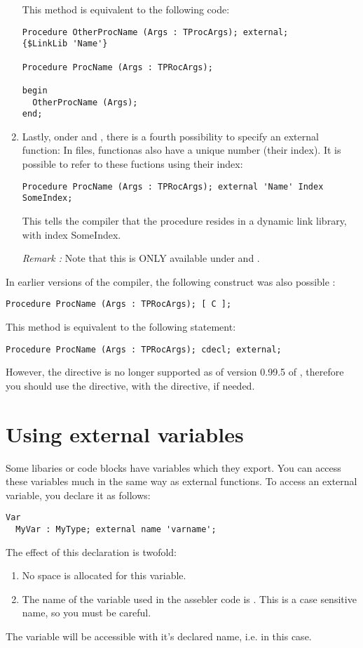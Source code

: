 \documentclass{report}
\begin{document}
\begin{enumerate}
This method is equivalent to the following code:
\begin{verbatim}
Procedure OtherProcName (Args : TProcArgs); external;
{$LinkLib 'Name'}

Procedure ProcName (Args : TPRocArgs);

begin
  OtherProcName (Args);
end;
\end{verbatim}
\item Lastly, onder \windows and \ostwo, there is a fourth possibility
to specify an external function: In  files, functionas also have
a unique number (their index). It is possible to refer to these fuctions
using their index:
\begin{verbatim}
Procedure ProcName (Args : TPRocArgs); external 'Name' Index SomeIndex;
\end{verbatim}
This tells the compiler that the procedure  resides in a
dynamic link library, with index {SomeIndex}.

{\em Remark :} Note that this is ONLY available under \windows and \ostwo.
\end{enumerate}

In earlier versions of the \fpc compiler, the following construct was
also possible :
\begin{verbatim}
Procedure ProcName (Args : TPRocArgs); [ C ];
\end{verbatim}
This method is equivalent to the following statement:
\begin{verbatim}
Procedure ProcName (Args : TPRocArgs); cdecl; external;
\end{verbatim}
However, the \var{[ C ]} directive is no longer supported as of version
0.99.5  of \fpc, therefore you should use the  directive,
with the  directive, if needed.

\section{Using external variables}
\label{se:ExternalVars}

Some libaries or code blocks have variables which they export. You can access
these variables much in the same way as external functions. To access an
external variable, you declare it as follows:

\begin{verbatim}
Var
  MyVar : MyType; external name 'varname';
\end{verbatim}
The effect of this declaration is twofold:
\begin{enumerate}
\item No space is allocated for this variable.
\item The name of the variable used in the assebler code is .
This is a case sensitive name, so you must be careful.
\end{enumerate}
The variable will be
accessible with it's declared name, i.e.  in this case.
\end{document}
